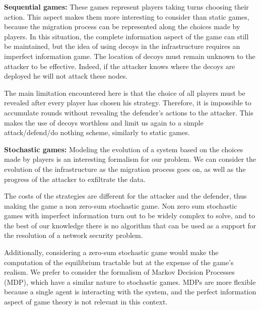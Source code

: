 \textbf{Sequential games: } These games represent players taking turns choosing their action. This aspect makes them more interesting to consider than static games, because the migration process can be represented along the choices made by players. In this situation, the complete information aspect of the game can still be maintained, but the idea of using decoys in the infrastructure requires an imperfect information game. The location of decoys must remain unknown to the attacker to be effective.
Indeed, if the attacker knows where the decoys are deployed he will not attack these nodes.

The main limitation encountered here is that the choice of all players must be revealed after every player has chosen his strategy. Therefore, it is impossible to accumulate rounds without revealing the defender's actions to the attacker. This makes the use of decoys worthless and limit us again to a simple attack/defend/do nothing scheme, similarly to static games.

\textbf{Stochastic games:} Modeling the evolution of a system based on the choices made by players is an interesting formalism for our problem. We can consider the evolution of the infrastructure as the migration process goes on, as well as the progress of the attacker to exfiltrate the data. 

The costs of the strategies are different for the attacker and the defender, thus making the game a non zero-sum stochastic game. Non zero sum stochastic games with imperfect information turn out to be widely complex to solve, and to the best of our knowledge there is no algorithm that can be used as a support for the resolution of a network security problem. 

Additionally, considering a zero-sum stochastic game would make the computation of the equilibrium tractable but at the expense of the game's realism.
We prefer to consider the formalism of Markov Decision Processes (MDP), which have a similar nature to stochastic games. MDPs are more flexible because a single agent is interacting with the system, and the perfect information aspect of game theory is not relevant in this context. 


